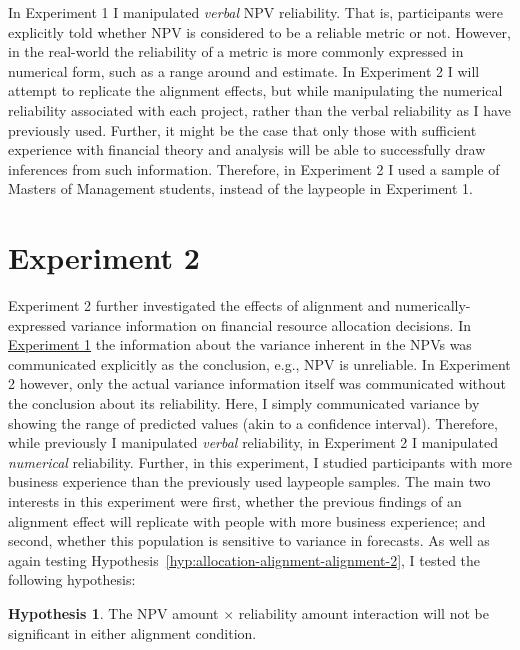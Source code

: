 \documentclass[a4paper, nobind, dvipsnames]{templates/ociamthesis}
\theoremstyle{definition}
\theoremstyle{definition}
\theoremstyle{definition}
\theoremstyle{definition}
\newtheorem{hypothesis}{Hypothesis}[chapter]
\theoremstyle{remark}
\begin{document}
In Experiment 1 I manipulated \emph{verbal} NPV reliability. That is, participants
were explicitly told whether NPV is considered to be a reliable metric or not.
However, in the real-world the reliability of a metric is more commonly
expressed in numerical form, such as a range around and estimate. In Experiment
2 I will attempt to replicate the alignment effects, but while manipulating the
numerical reliability associated with each project, rather than the verbal
reliability as I have previously used. Further, it might be the case that only
those with sufficient experience with financial theory and analysis will be able
to successfully draw inferences from such information. Therefore, in Experiment
2 I used a sample of Masters of Management students, instead of the laypeople in
Experiment 1.

\hypertarget{alignment-3}{%
\section{Experiment 2}\label{alignment-3}}

Experiment 2 further investigated the effects of alignment and
numerically-expressed variance information on financial resource allocation
decisions. In \protect\hyperlink{alignment-2}{Experiment 1} the information about the variance
inherent in the NPVs was communicated explicitly as the conclusion, e.g., NPV is
unreliable. In Experiment 2 however, only the actual variance information itself
was communicated without the conclusion about its reliability. Here, I simply
communicated variance by showing the range of predicted values (akin to a
confidence interval). Therefore, while previously I manipulated \emph{verbal}
reliability, in Experiment 2 I manipulated \emph{numerical} reliability. Further, in
this experiment, I studied participants with more business experience than the
previously used laypeople samples. The main two interests in this experiment
were first, whether the previous findings of an alignment effect will replicate
with people with more business experience; and second, whether this population
is sensitive to variance in forecasts. As well as again testing
Hypothesis~\ref{hyp:allocation-alignment-alignment-2}, I tested the following
hypothesis:

\begin{hypothesis}
\protect\hypertarget{hyp:allocation-npv-reliability-alignment-3}{}{\label{hyp:allocation-npv-reliability-alignment-3} }The NPV amount \(\times\) reliability amount interaction will not be significant
in either alignment condition.
\end{hypothesis}
\end{document}
